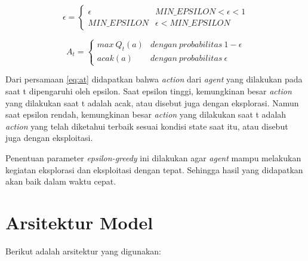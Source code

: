 \begin{equation}
	\epsilon = \begin{cases}\epsilon & MIN\_EPSILON < \epsilon < 1\\MIN\_EPSILON & \epsilon < MIN\_EPSILON\end{cases}	\label{eq:eps_min}
\end{equation}

\begin{equation}
	A_t = \begin{cases}max\:Q_t(a) & dengan\:probabilitas\:1-\epsilon\\acak(a) & dengan\:probabilitas\:\epsilon\end{cases}
	\label{eq:at}
\end{equation}

Dari persamaan \ref{eq:at} didapatkan bahwa \textit{action }dari \textit{agent} yang dilakukan pada saat t dipengaruhi oleh epsilon. Saat epsilon tinggi, kemungkinan besar \textit{action} yang dilakukan saat t adalah acak, atau disebut juga dengan eksplorasi. Namun saat epsilon rendah, kemungkinan besar \textit{action} yang dilakukan saat t adalah \textit{action} yang telah diketahui terbaik sesuai kondisi state saat itu, atau disebut juga dengan eksploitasi.

Penentuan parameter \textit{epsilon-greedy} ini dilakukan agar \textit{agent} mampu melakukan kegiatan eksplorasi dan eksploitasi dengan tepat. Sehingga hasil yang didapatkan akan baik dalam waktu cepat.

\section{Arsitektur Model}
\label{sec:arsitektur_model}

Berikut adalah arsitektur yang digunakan:


